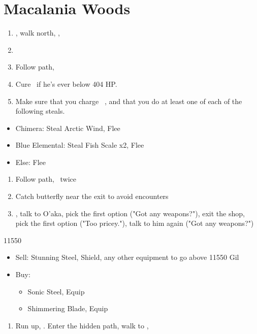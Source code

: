 \chapter{Macalania Woods}

\begin{enumerate}
	\item \sd, walk north, \sd, \save
	\item \formation{\tidus}{\rikku}{\auron}
	\item Follow path, 
	\item Cure \tidus\ if he's ever below 404 HP.
	\item Make sure that you charge \rikku\ \od, and that you do at least one of each of the following steals.
\end{enumerate}
\begin{encounters}
	\begin{itemize}
		\item Chimera: Steal Arctic Wind, Flee
		\item Blue Elemental: Steal Fish Scale x2, Flee
		\item Else: Flee
	\end{itemize}
\end{encounters}
\begin{enumerate}[resume]
	\item Follow path, \sd\ twice
	\item Catch butterfly near the exit to avoid encounters
	\formation{\tidus}{\yuna}{\kimahri}
	\item \save, talk to O'aka, pick the first option ("Got any weapons?"), exit the shop, pick the first option ("Too pricey."), talk to him again ("Got any weapons?")
\end{enumerate}
\begin{shop}{11550}
	\begin{itemize}
		\item Sell: Stunning Steel, Shield, any other equipment to go above 11550 Gil
		\item Buy:
			\begin{itemize}
				\item Sonic Steel, Equip
				\item Shimmering Blade, Equip
			\end{itemize}
	\end{itemize}
\end{shop}
\begin{enumerate}[resume]
	\item Run up, \sd. Enter the hidden path, walk to \auron, \sd
\end{enumerate}
